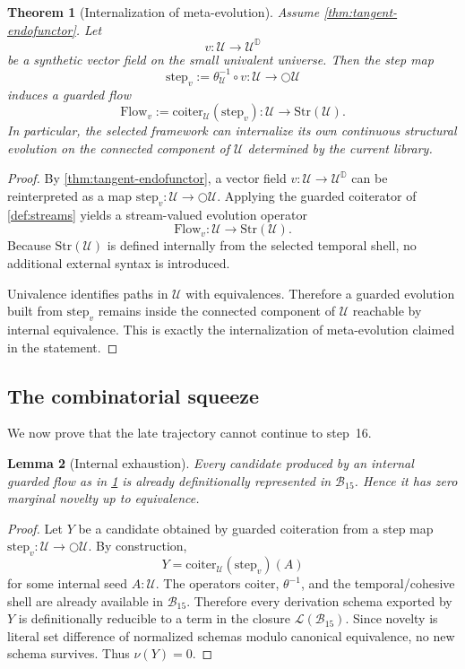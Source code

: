 \documentclass[11pt]{article}
\theoremstyle{plain}
\newtheorem{theorem}{Theorem}[section]
\newtheorem{lemma}[theorem]{Lemma}
\theoremstyle{definition}
\theoremstyle{remark}
\newcommand{\D}{\mathbb{D}}
\newcommand{\U}{\mathcal{U}}
\newcommand{\B}{\mathcal{B}}
\newcommand{\Lcal}{\mathcal{L}}
\newcommand{\Str}{\mathrm{Str}}
\newcommand{\coiter}{\mathrm{coiter}}
\begin{document}
\begin{theorem}[Internalization of meta-evolution]
\label{thm:internalization}
Assume \cref{thm:tangent-endofunctor}. Let
\[
  v:\U\to\U^\D
\]
be a synthetic vector field on the small univalent universe. Then the step map
\[
  \mathrm{step}_v:=\theta_{\U}^{-1}\circ v:\U\to\bigcirc\U
\]
induces a guarded flow
\[
  \mathrm{Flow}_v:=\coiter_{\U}(\mathrm{step}_v):\U\to\Str(\U).
\]
In particular, the selected framework can internalize its own continuous structural evolution on the connected component of $\U$ determined by the current library.
\end{theorem}

\begin{proof}
By \cref{thm:tangent-endofunctor}, a vector field $v:\U\to\U^\D$ can be reinterpreted as a map $\mathrm{step}_v:\U\to\bigcirc\U$. Applying the guarded coiterator of \cref{def:streams} yields a stream-valued evolution operator
\[
  \mathrm{Flow}_v:\U\to\Str(\U).
\]
Because $\Str(\U)$ is defined internally from the selected temporal shell, no additional external syntax is introduced.

Univalence identifies paths in $\U$ with equivalences. Therefore a guarded evolution built from $\mathrm{step}_v$ remains inside the connected component of $\U$ reachable by internal equivalence. This is exactly the internalization of meta-evolution claimed in the statement.
\end{proof}

\subsection{The combinatorial squeeze}

We now prove that the late trajectory cannot continue to step~16.

\begin{lemma}[Internal exhaustion]
\label{lem:internal-exhaustion}
Every candidate produced by an internal guarded flow as in \cref{thm:internalization} is already definitionally represented in $\B_{15}$. Hence it has zero marginal novelty up to equivalence.
\end{lemma}

\begin{proof}
Let $Y$ be a candidate obtained by guarded coiteration from a step map $\mathrm{step}_v:\U\to\bigcirc\U$. By construction,
\[
  Y = \coiter_{\U}(\mathrm{step}_v)(A)
\]
for some internal seed $A:\U$. The operators $\coiter$, $\theta^{-1}$, and the temporal/cohesive shell are already available in $\B_{15}$. Therefore every derivation schema exported by $Y$ is definitionally reducible to a term in the closure $\Lcal(\B_{15})$. Since novelty is literal set difference of normalized schemas modulo canonical equivalence, no new schema survives. Thus $\nu(Y)=0$.
\end{proof}
\end{document}
